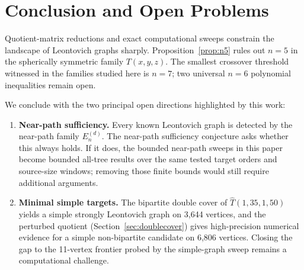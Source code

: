 \section{Conclusion and Open Problems}
\label{sec:conclusion}

Quotient-matrix reductions and exact computational sweeps constrain the
landscape of Leontovich graphs sharply. Proposition~\ref{prop:n5} rules
out $n=5$ in the spherically symmetric family $T(x,y,z)$. The smallest
crossover threshold witnessed in the
families studied here is $n=7$; two universal $n=6$ polynomial
inequalities remain open.

We conclude with the two principal open directions highlighted by this work:

\begin{enumerate}
  \item \textbf{Near-path sufficiency.} Every known Leontovich graph is
    detected by the near-path family $E_n^{(d)}$. The near-path
    sufficiency conjecture asks whether this always holds. If it does,
    the bounded near-path sweeps in this paper become bounded all-tree
    results over the same tested target orders and source-size windows;
    removing those finite bounds would still require additional arguments.
  \item \textbf{Minimal simple targets.} The bipartite double cover of
    $\hat{T}(1,35,1,50)$ yields a simple strongly Leontovich graph on
    3,644 vertices, and the perturbed quotient
    (Section~\ref{sec:doublecover}) gives high-precision numerical evidence
    for a simple non-bipartite candidate on 6,806 vertices. Closing the
    gap to the 11-vertex frontier probed by the simple-graph sweep
    remains a computational challenge.
\end{enumerate}
